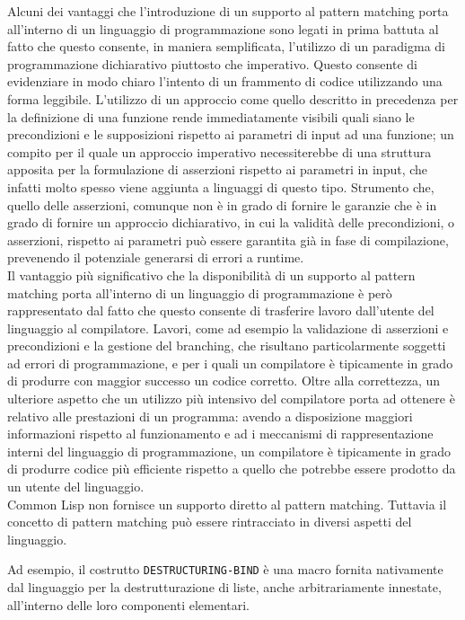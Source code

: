 Alcuni dei vantaggi che l'introduzione di un supporto al pattern matching porta
all’interno di un linguaggio di programmazione sono legati in prima battuta al
fatto che questo consente, in maniera semplificata, l’utilizzo di un paradigma
di programmazione dichiarativo piuttosto che imperativo. Questo consente di
evidenziare in modo chiaro l’intento di un frammento di codice utilizzando una
forma leggibile. L’utilizzo di un approccio come quello descritto in precedenza
per la definizione di una funzione rende immediatamente visibili quali siano le
precondizioni e le supposizioni rispetto ai parametri di input ad una funzione;
un compito per il quale un approccio imperativo necessiterebbe di una struttura
apposita per la formulazione di asserzioni rispetto ai parametri in input, che
infatti molto spesso viene aggiunta a linguaggi di questo tipo. Strumento che,
quello delle asserzioni, comunque non è in grado di fornire le garanzie che è
in grado di fornire un approccio dichiarativo, in cui la validità delle
precondizioni, o asserzioni, rispetto ai parametri può essere garantita già in
fase di compilazione, prevenendo il potenziale generarsi di errori a runtime.\\

Il vantaggio più significativo che la disponibilità di un supporto al pattern
matching porta all’interno di un linguaggio di programmazione è però
rappresentato dal fatto che questo consente di trasferire lavoro dall’utente del
linguaggio al compilatore. Lavori, come ad esempio la validazione di asserzioni
e precondizioni e la gestione del branching, che risultano particolarmente
soggetti ad errori di programmazione, e per i quali un compilatore è tipicamente
in grado di produrre con maggior successo un codice corretto. Oltre alla
correttezza, un ulteriore aspetto che un utilizzo più intensivo del compilatore
porta ad ottenere è relativo alle prestazioni di un programma: avendo a
disposizione maggiori informazioni rispetto al funzionamento e ad i meccanismi
di rappresentazione interni del linguaggio di programmazione, un compilatore è
tipicamente in grado di produrre codice più efficiente rispetto a quello che
potrebbe essere prodotto da un utente del linguaggio.\\

Common Lisp non fornisce un supporto diretto al pattern matching. Tuttavia il
concetto di pattern matching può essere rintracciato in diversi aspetti del
linguaggio.

Ad esempio, il costrutto \texttt{DESTRUCTURING-BIND} è una macro fornita
nativamente dal linguaggio per la destrutturazione di liste, anche
arbitrariamente innestate, all’interno delle loro componenti elementari.

